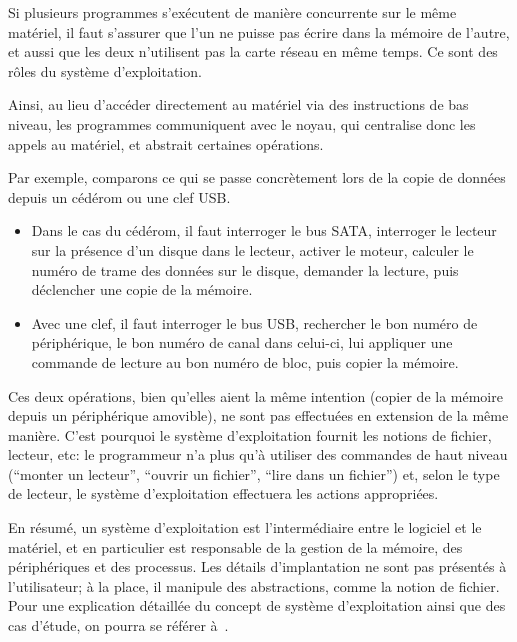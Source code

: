 Si plusieurs programmes s'exécutent de manière concurrente sur le même matériel,
il faut s'assurer que l'un ne puisse pas écrire dans la mémoire de l'autre, et
aussi que les deux n'utilisent pas la carte réseau en même temps. Ce sont des
rôles du système d'exploitation.

Ainsi, au lieu d'accéder directement au matériel via des instructions de bas
niveau, les programmes communiquent avec le noyau, qui centralise donc les
appels au matériel, et abstrait certaines opérations.

Par exemple, comparons ce qui se passe concrètement lors de la copie de données
depuis un cédérom ou une clef USB.\@

\begin{itemize}

  \item Dans le cas du cédérom, il faut interroger le bus SATA, interroger le
    lecteur sur la présence d'un disque dans le lecteur, activer le moteur,
    calculer le numéro de trame des données sur le disque, demander la lecture,
    puis déclencher une copie de la mémoire.

  \item Avec une clef, il faut interroger le bus USB, rechercher le bon numéro
    de périphérique, le bon numéro de canal dans celui-ci, lui appliquer une
    commande de lecture au bon numéro de bloc, puis copier la mémoire.

\end{itemize}

Ces deux opérations, bien qu'elles aient la même intention (copier de la mémoire
depuis un périphérique amovible), ne sont pas effectuées en extension de la même
manière. C'est pourquoi le système d'exploitation fournit les notions de
fichier, lecteur, etc: le programmeur n'a plus qu'à utiliser des commandes de
haut niveau (\enquote{monter un lecteur}, \enquote{ouvrir un fichier},
\enquote{lire dans un fichier}) et, selon le type de lecteur, le système
d'exploitation effectuera les actions appropriées.

En résumé, un système d'exploitation est l'intermédiaire entre le logiciel et le
matériel, et en particulier est responsable de la gestion de la mémoire, des
périphériques et des processus. Les détails d'implantation ne sont pas présentés
à l'utilisateur; à la place, il manipule des abstractions, comme la notion de
fichier. Pour une explication détaillée du concept de système d'exploitation
ainsi que des cas d'étude, on pourra se référer à~\cite{tanenbaum}.

